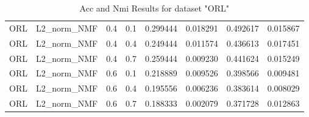\begin{table}[p]
\begin{tabular}{cccccccc}
ORL              & L2\_norm\_NMF         & 0.4        & 0.1        & 0.299444           & 0.018291          & 0.492617           & 0.015867          \\
ORL              & L2\_norm\_NMF         & 0.4        & 0.4        & 0.249444           & 0.011574          & 0.436613           & 0.017451          \\
ORL              & L2\_norm\_NMF         & 0.4        & 0.7        & 0.259444           & 0.009230          & 0.441624           & 0.015249          \\
ORL              & L2\_norm\_NMF         & 0.6        & 0.1        & 0.218889           & 0.009526          & 0.398566           & 0.009481          \\
ORL              & L2\_norm\_NMF         & 0.6        & 0.4        & 0.195556           & 0.006236          & 0.383614           & 0.008029          \\
ORL              & L2\_norm\_NMF         & 0.6        & 0.7        & 0.188333           & 0.002079          & 0.371728           & 0.012863         \\
\hline
\end{tabular}
\caption{Acc and Nmi Results for dataset "ORL"}
\label{tab:orl}
\end{table}

